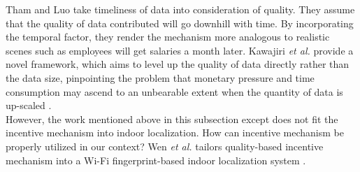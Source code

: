 \documentclass[10pt,conference,compsocconf,letterpaper]{IEEEtran}
\begin{document}
Tham and Luo take timeliness of data into consideration of quality\cite{Tham2013Quality}. %
They assume that the quality of data contributed will go downhill with time. %
By incorporating the temporal factor, they render the mechanism more analogous to realistic scenes such as employees will get salaries a month later.
Kawajiri \emph{et al.} provide a novel framework, %
which aims to level up the quality of data directly rather than the data size, pinpointing the problem that monetary pressure and time consumption may ascend to an unbearable extent when the quantity of data is up-scaled \cite{Kawajiri2014Steered}.\\ %
\indent However, the work mentioned above in this subsection except \cite{Kawajiri2014Steered} does not fit the incentive mechanism into indoor localization. %
How can incentive mechanism be properly utilized in our context? Wen \emph{et al.} tailors quality-based incentive mechanism into a Wi-Fi fingerprint-based indoor localization system \cite{Wen2015Quality}. %
\end{document}
